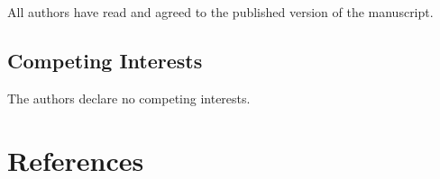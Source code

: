 \documentclass{article}
\begin{document}
All authors have read and agreed to the published version of the
manuscript.

\hypertarget{competing-interests}{%
\subsection*{Competing Interests}\label{competing-interests}}

The authors declare no competing interests.

\hypertarget{references}{%
\section*{References}\label{references}}
\end{document}
